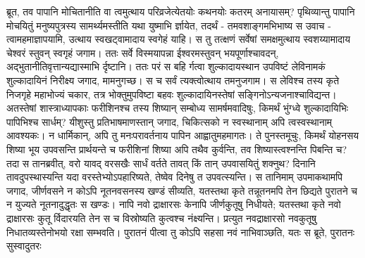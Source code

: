 \vakya ब्रूत, तव पापानि मोचितानीति वा त्वमुत्थाय परिव्रजेत्येतयोः कथनयोः कतरम् अनायासम्?
\vakya पृथिव्यान्तु पापानि मोचयितुं मनुष्यपुत्रस्य सामर्थ्यमस्तीति यथा युष्माभि र्ज्ञायेत, तदर्थं - तमवशाङ्गमभिभाष्य स उवाच - त्वामहमाज्ञापयामि, उत्थाय स्वखट्वामादाय स्वगेहं याहि।
\vakya स तु तत्क्षणं सर्वेषां समक्षमुत्थाय स्वशय्यामादाय चेश्वरं स्तुवन् स्वगृहं जगाम।
\vakya ततः सर्वे विस्मयापन्ना ईश्वरमस्तुवन् भयपूर्णाश्चावदन्, अद्भुतानीतिवृत्तान्यद्यास्माभि र्दृष्टानि।
\vakya ततः परं स बहि र्गत्वा शुल्कादायस्थान उपविष्टं लेविनामकं शुल्कादायिनं निरीक्ष्य जगाद, मामनुगच्छ।
\vakya स च सर्वं त्यक्त्वोत्थाय तमनुजगाम।
\vakya स लेविश्च तस्य कृते निजगृहे महाभोज्यं चकार, तत्र भोक्तुमुपविष्टा बहवः शुल्कादायिनस्तेषां सङ्गिनोऽन्यजनाश्चाविद्यन्त।
\vakya अतस्तेषां शास्त्राध्यापकाः फरीशिनश्च तस्य शिष्यान् सम्बोध्य सामर्षमवादिषुः, किमर्थं भुंग्ध्वे शुल्कादायिभिः पापिभिश्च सार्धम्?
\vakya यीशुस्तु प्रतिभाषमाणस्तान् जगाद, चिकित्सको न स्वस्थानाम् अपि त्वस्वस्थानाम् आवश्यकः।
\vakya न धार्मिकान्, अपि तु मनःपरावर्तनाय पापिन आह्वातुमहमागतः।
\vakya ते पुनस्तमूचुः, किमर्थं योहनसय शिष्या भूय उपवसन्ति प्रार्थयन्ते च फरीशिनां शिष्या अपि तथैव कुर्वन्ति, तव शिष्यास्त्वश्नन्ति पिबन्ति च?
\vakya तदा स तानब्रवीत्, वरो यावद् वरसखैः सार्धं वर्तते तावत् किं तान् उपवासयितुं शक्नुथ?
\vakya दिनानि तावदुपस्थास्यन्ति यदा वरस्तेभ्योऽपहारिष्यते, तेष्वेव दिनेषु त उपवत्स्यन्ति।
\vakya स तानिमाम् उपमाकथामपि जगाद, जीर्णवसने न कोऽपि नूतनवसनस्य खण्डं सीव्यति, यतस्तथा कृते तन्नूतनमपि तेन छिद्यते पुरातने च न युज्यते नूतनादुद्धृतः स खण्डः।
\vakya नापि नवो द्राक्षारसः केनापि जीर्णकुतूषु निधीयते; यतस्तथा कृते नवो द्राक्षारसः कुतू र्विदारयति तेन स च विस्रोष्यति कुत्वश्च नंक्ष्यन्ति।
\vakya प्रत्युत नवद्राक्षारसो नवकुतूषु निधातव्यस्तेनोभयो रक्षा सम्भवति।
\vakya पुरातनं पीत्वा तु कोऽपि सहसा नवं नाभिवाञ्छति, यतः स ब्रूते, पुरातनः सुस्वादुतरः\eoc